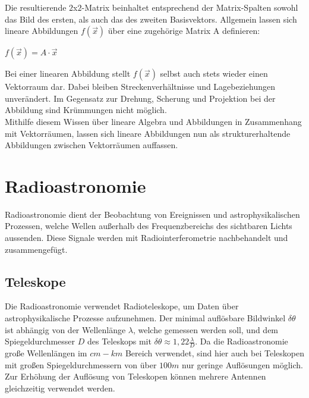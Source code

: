 \documentclass[]{dsadokumentation}
\begin{document}
Die resultierende $2$x$2$-Matrix beinhaltet entsprechend der Matrix-Spalten sowohl das Bild des ersten, als auch das des zweiten Basisvektors. Allgemein lassen sich lineare Abbildungen $f(\vec{x})$ über eine zugehörige Matrix A definieren:
\begin{center} $f(\vec{x}) = A \cdot \vec{x}$ \end{center}

Bei einer linearen Abbildung stellt $f(\vec{x})$ selbst auch stets wieder einen Vektorraum dar. Dabei bleiben Streckenverhältnisse und Lagebeziehungen unverändert. Im Gegensatz zur Drehung, Scherung und Projektion bei der Abbildung sind Krümmungen nicht möglich. \\

Mithilfe diesem Wissen über lineare Algebra und Abbildungen in Zusammenhang mit Vektorräumen, lassen sich lineare Abbildungen nun als strukturerhaltende Abbildungen zwischen Vektorräumen auffassen.

\section{Radioastronomie}

Radioastronomie dient der Beobachtung von Ereignissen und astrophysikalischen Prozessen, welche Wellen außerhalb des Frequenzbereichs des sichtbaren Lichts aussenden. Diese Signale werden mit Radiointerferometrie nachbehandelt und zusammengefügt.

\subsection{Teleskope}

Die Radioastronomie verwendet Radioteleskope, um Daten über astrophysikalische Prozesse aufzunehmen.
Der minimal auflösbare Bildwinkel $\delta\theta$ ist abhängig von der Wellenlänge $\lambda$, welche gemessen werden soll, und dem Spiegeldurchmesser $D$ des Teleskops mit $\delta\theta\approx1,22\frac{\lambda}{D}$.
Da die Radioastronomie große Wellenlängen im $cm-km$ Bereich verwendet, sind hier auch bei Teleskopen mit großen Spiegeldurchmessern von über $100m$ nur geringe Auflösungen möglich. Zur Erhöhung der Auflösung von Teleskopen können mehrere Antennen gleichzeitig verwendet werden.
\end{document}
